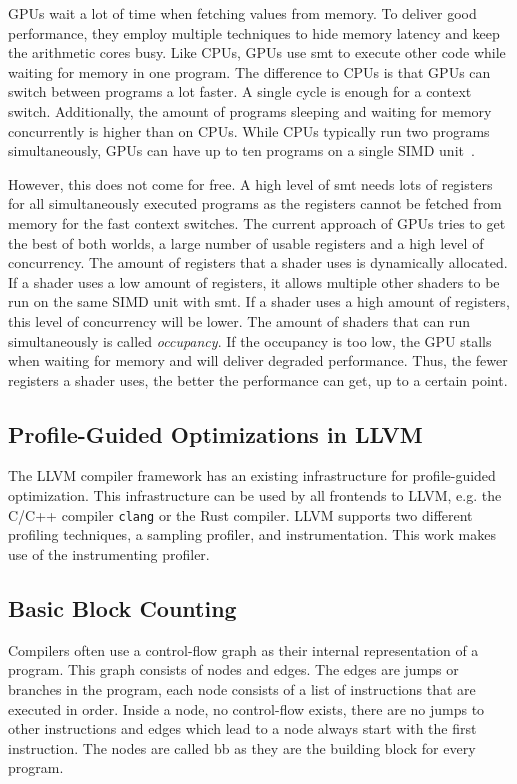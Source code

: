 GPUs wait a lot of time when fetching values from memory. To deliver good performance, they employ multiple techniques to hide memory latency and keep the arithmetic cores busy.
Like CPUs, GPUs use \gls{smt} to execute other code while waiting for memory in one program.
The difference to CPUs is that GPUs can switch between programs a lot faster. A single cycle is enough for a context switch.
Additionally, the amount of programs sleeping and waiting for memory concurrently is higher than on CPUs.
While CPUs typically run two programs simultaneously, GPUs can have up to ten programs on a single SIMD unit~\cite{Aaltonen2017}.

However, this does not come for free. A high level of \gls{smt} needs lots of registers for all simultaneously executed programs as the registers cannot be fetched from memory for the fast context switches.
The current approach of GPUs tries to get the best of both worlds, a large number of usable registers and a high level of concurrency.
The amount of registers that a shader uses is dynamically allocated.
If a shader uses a low amount of registers, it allows multiple other shaders to be run on the same SIMD unit with \gls{smt}.
If a shader uses a high amount of registers, this level of concurrency will be lower.
The amount of shaders that can run simultaneously is called \emph{occupancy}.
If the occupancy is too low, the GPU stalls when waiting for memory and will deliver degraded performance.
Thus, the fewer registers a shader uses, the better the performance can get, up to a certain point.

\subsection{Profile-Guided Optimizations in LLVM}
\label{sub:pgo-background}
The LLVM compiler framework has an existing infrastructure for profile-guided optimization. This infrastructure can be used by all frontends to LLVM, e.g. the C/C++ compiler \texttt{clang} or the Rust compiler. LLVM supports two different profiling techniques, a sampling profiler, and instrumentation.
This work makes use of the instrumenting profiler.

\subsection{Basic Block Counting}
\label{sub:counter-instrumentation}
Compilers often use a control-flow graph as their internal representation of a program.
This graph consists of nodes and edges. The edges are jumps or branches in the program, each node consists of a list of instructions that are executed in order.
Inside a node, no control-flow exists, there are no jumps to other instructions and edges which lead to a node always start with the first instruction.
The nodes are called \acrfull{bb} as they are the building block for every program.

